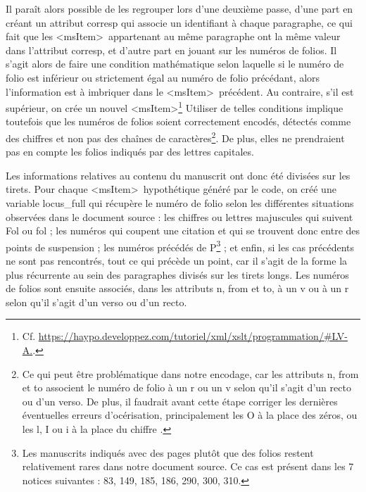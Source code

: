\documentclass[a4paper,12pt,twoside]{book}
\begin{document}
Il paraît alors possible de les regrouper lors d’une deuxième passe, d'une part en créant un attribut corresp qui associe un identifiant à chaque paragraphe, ce qui fait que les \textless msItem\textgreater~appartenant au même paragraphe ont la même valeur dans l'attribut corresp, et d'autre part en jouant sur les numéros de folios. Il s'agit alors de faire une condition mathématique selon laquelle si le numéro de folio est inférieur ou strictement égal au numéro de folio précédant, alors l'information est à imbriquer dans le \textless msItem\textgreater~précédent. Au contraire, s'il est supérieur, on crée un nouvel \textless msItem\textgreater \footnote{Cf. \url{https://haypo.developpez.com/tutoriel/xml/xslt/programmation/#LV-A.}.} Utiliser de telles conditions implique toutefois que les numéros de folios soient correctement encodés, détectés comme des chiffres et non pas des chaînes de caractères\footnote{Ce qui peut être problématique dans notre encodage, car les attributs n, from et to associent le numéro de folio à un \og r\fg{} ou un \og v\fg{} selon qu'il s'agit d'un recto ou d'un verso. De plus, il faudrait avant cette étape corriger les dernières éventuelles erreurs d'océrisation, principalement les \og O\fg{} à la place des zéros, ou les \og l\fg{}, \og I\fg{} ou \og i\fg{} à la place du chiffre \fg{}.}. De plus, elles ne prendraient pas en compte les folios indiqués par des lettres capitales.

Les informations relatives au contenu du manuscrit ont donc été divisées sur les tirets. Pour chaque \textless msItem\textgreater~hypothétique généré par le code, on créé une variable \og locus\_full\fg{} qui récupère le numéro de folio selon les différentes situations observées dans le document source : les chiffres ou lettres majuscules qui suivent \og Fol\fg{} ou \og fol\fg{} ; les numéros qui coupent une citation et qui se trouvent donc entre des points de suspension ; les numéros précédés de \og P\fg{}\footnote{Les manuscrits indiqués avec des pages plutôt que des folios restent relativement rares dans notre document source. Ce cas est présent dans les 7 notices suivantes : 83, 149, 185, 186, 290, 300, 310.} ; et enfin, si les cas précédents ne sont pas rencontrés, tout ce qui précède un point, car il s'agit de la forme la plus récurrente au sein des paragraphes divisés sur les tirets longs. Les numéros de folios sont ensuite associés, dans les attributs n, from et to, à un \og v\fg{} ou à un \og r\fg{} selon qu'il s'agit d'un verso ou d'un recto. 
\end{document}
